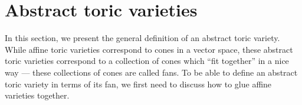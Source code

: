 \documentclass[12pt]{amsart}
\theoremstyle{plain}
\begin{document}

\newpage
\section{Abstract toric varieties}
In this section, we present the general definition of an abstract toric variety.
While affine toric varieties correspond to cones in a vector space, these abstract toric varieties correspond to a collection of cones which ``fit together'' in a nice way --- these collections of cones are called fans.
To be able to define an abstract toric variety in terms of its fan, we first need to discuss how to glue affine varieties together.
\end{document}
